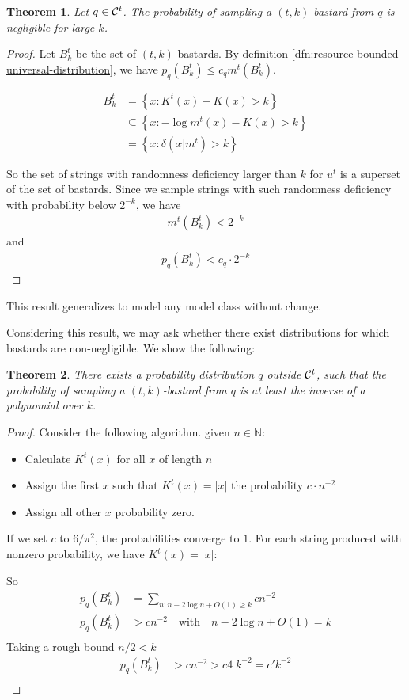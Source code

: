 \documentclass[10pt,a4paper,oneside]{article}
\newtheorem{thm}{Theorem}
\begin{document}
\begin{thm}
Let $q \in {\cal C}^t$. The probability of sampling a $(t, k)$-bastard from $q$ is negligible for large $k$.
\end{thm}
\begin{proof}

Let $B^t_k$ be the set of $(t, k)$-bastards. By definition \ref{dfn:resource-bounded-universal-distribution}, we have $p_q(B^t_k) \leq c_q m^t(B^t_k)$.

\begin{align*}
B^t_k &= \left\{x : K^t(x) - K(x) > k\right\} \\ 
	&\subseteq \left\{x : - \log m^t(x) - K(x) > k\right\} \\
	&= \left\{x : \delta(x | m^t) > k\right\}
\end{align*}

So the set of strings with randomness deficiency larger than $k$ for $u^t$ is a superset of the set of bastards. Since we sample strings with such randomness deficiency with probability below $2^{-k}$, we have
\begin{align*}
m^t\left(B^t_k\right) < 2^{-k} 
\end{align*}
and 
\begin{align*}
p_q\left(B^t_k\right) < c_q \cdot 2^{-k} 
\end{align*}
\end{proof}

This result generalizes to model any model class without change.

Considering this result, we may ask whether there exist distributions for which bastards are non-negligible. We show the following:

\begin{thm}
There exists a probability distribution $q$ outside ${\cal C}^t$, such that the probability of sampling a $(t, k)$-bastard from $q$ is at least the inverse of a polynomial over $k$.
\end{thm}
\begin{proof}
Consider the following algorithm.
given $n \in {\mathbb N}$:
\begin{itemize}
  \item Calculate $K^t(x)$ for all $x$ of length $n$ 
  \item Assign the first $x$ such that $K^t(x) = |x|$ the probability $c \cdot n^{-2}$
  \item Assign all other $x$ probability zero.
\end{itemize}
If we set $c$ to $6 / \pi^2$, the probabilities converge to $1$. For each string produced with nonzero probability, we have $K^t(x) = |x|$:

So
\begin{align*}
p_q(B^t_k) &= \sum_{n : n - 2\log n + O(1) \geq k} cn^{-2}\\
p_q(B^t_k) &> cn^{-2} \quad\text{with}\quad n -2\log n + O(1) = k\\
\end{align*}
Taking a rough bound $n/2 < k$
\begin{align*}
p_q(B^t_k) &> cn^{-2} > c4 \;k^{-2} = c' k^{-2}\\
\end{align*}
\end{proof}
\end{document}
